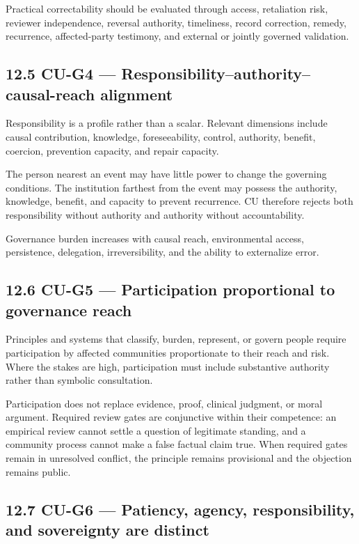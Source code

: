 \documentclass[
  11pt,
]{article}
\begin{document}
Practical correctability should be evaluated through access, retaliation
risk, reviewer independence, reversal authority, timeliness, record
correction, remedy, recurrence, affected-party testimony, and external
or jointly governed validation.

\subsection{12.5 CU-G4 --- Responsibility--authority--causal-reach
alignment}\label{cu-g4-responsibilityauthoritycausal-reach-alignment}

Responsibility is a profile rather than a scalar. Relevant dimensions
include causal contribution, knowledge, foreseeability, control,
authority, benefit, coercion, prevention capacity, and repair capacity.

The person nearest an event may have little power to change the
governing conditions. The institution farthest from the event may
possess the authority, knowledge, benefit, and capacity to prevent
recurrence. CU therefore rejects both responsibility without authority
and authority without accountability.

Governance burden increases with causal reach, environmental access,
persistence, delegation, irreversibility, and the ability to externalize
error.

\subsection{12.6 CU-G5 --- Participation proportional to governance
reach}\label{cu-g5-participation-proportional-to-governance-reach}

Principles and systems that classify, burden, represent, or govern
people require participation by affected communities proportionate to
their reach and risk. Where the stakes are high, participation must
include substantive authority rather than symbolic consultation.

Participation does not replace evidence, proof, clinical judgment, or
moral argument. Required review gates are conjunctive within their
competence: an empirical review cannot settle a question of legitimate
standing, and a community process cannot make a false factual claim
true. When required gates remain in unresolved conflict, the principle
remains provisional and the objection remains public.

\subsection{12.7 CU-G6 --- Patiency, agency, responsibility, and
sovereignty are
distinct}\label{cu-g6-patiency-agency-responsibility-and-sovereignty-are-distinct}
\end{document}
